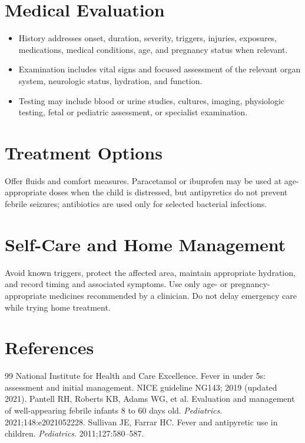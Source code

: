 \section*{Medical Evaluation}
\begin{itemize}
  \item History addresses onset, duration, severity, triggers, injuries, exposures, medications, medical conditions, age, and pregnancy status when relevant.
  \item Examination includes vital signs and focused assessment of the relevant organ system, neurologic status, hydration, and function.
  \item Testing may include blood or urine studies, cultures, imaging, physiologic testing, fetal or pediatric assessment, or specialist examination.
\end{itemize}

\section*{Treatment Options}
Offer fluids and comfort measures. Paracetamol or ibuprofen may be used at age-appropriate doses when the child is distressed, but antipyretics do not prevent febrile seizures; antibiotics are used only for selected bacterial infections.

\section*{Self-Care and Home Management}
Avoid known triggers, protect the affected area, maintain appropriate hydration, and record timing and associated symptoms. Use only age- or pregnancy-appropriate medicines recommended by a clinician. Do not delay emergency care while trying home treatment.

\section*{References}
\begin{thebibliography}{99}
 National Institute for Health and Care Excellence. Fever in under 5s: assessment and initial management. NICE guideline NG143; 2019 (updated 2021).
 Pantell RH, Roberts KB, Adams WG, et al. Evaluation and management of well-appearing febrile infants 8 to 60 days old. \textit{Pediatrics}. 2021;148:e2021052228.
 Sullivan JE, Farrar HC. Fever and antipyretic use in children. \textit{Pediatrics}. 2011;127:580--587.
\end{thebibliography}
